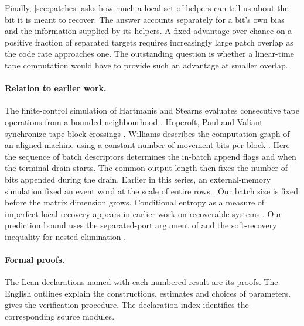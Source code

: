 Finally, \cref{sec:patches} asks how much a local set of helpers can tell
us about the bit it is meant to recover. The answer accounts separately
for a bit's own bias and the information supplied by its helpers. A
fixed advantage over chance on a positive fraction of separated targets
requires increasingly large patch overlap as the code rate approaches
one. The outstanding question is whether a linear-time tape computation
would have to provide such an advantage at smaller overlap.

\paragraph{Relation to earlier work.}
The finite-control simulation of Hartmanis and Stearns evaluates
consecutive tape operations from a bounded neighbourhood
\cite[Theorem~2]{HartmanisStearns}. Hopcroft, Paul and Valiant synchronize
tape-block crossings \cite[\S2]{HPV1977}. Williams describes the
computation graph of an aligned machine using a constant number of
movement bits per block \cite[\S\S2--3]{Williams}. Here the sequence of batch descriptors determines the in-batch append
flags and when the terminal drain starts. The common output length
then fixes the number of bits appended during the drain. Earlier in this series, an external-memory
simulation fixed an event word at the scale of entire rows
\cite[Theorem~EM]{PaperEleven}. Our batch size is fixed before the
matrix dimension grows. Conditional entropy as a measure of imperfect
local recovery appears in earlier work on recoverable systems
\cite[\S IV]{ElishcoBarg}. Our prediction bound uses the separated-port
argument of \cite[Lemma~4.1]{PaperFive} and the soft-recovery inequality
for nested elimination \cite[Theorem~S]{SoftRecovery}.

\paragraph{Formal proofs.}
The Lean declarations named with each numbered result are its proofs.
The English outlines explain the constructions, estimates and choices of
parameters.  gives the verification procedure. The declaration index identifies the corresponding source modules.
